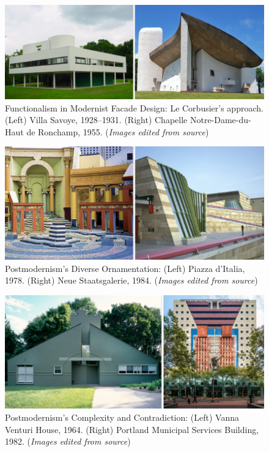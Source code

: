     \begin{figure}[htb]
        \centering
        \includegraphics[width= \linewidth]{Images/ModernistFacade}
        \caption{Functionalism in Modernist Facade Design: Le Corbusier's approach. (Left) Villa Savoye, 1928--1931. (Right) Chapelle Notre-Dame-du-Haut de Ronchamp, 1955. (\textit{Images edited from source})}
        \label{fig:Modernistfacade}
    \end{figure}

    \begin{figure}[htb]
        \centering
        \includegraphics[width= \linewidth]{Images/PostmodernOrnament}
        \caption{Postmodernism's Diverse Ornamentation: (Left) Piazza d’Italia, 1978. (Right) Neue Staatsgalerie, 1984. (\textit{Images edited from source})}
        \label{fig:postmodernOrnamnet}
    \end{figure}

\begin{figure}[htb]
\centering
\includegraphics[width= \linewidth]{Images/PostmodernismVenturi}
\caption{Postmodernism's Complexity and Contradiction: (Left) Vanna Venturi House, 1964. (Right) Portland Municipal Services Building, 1982. (\textit{Images edited from source})}
\label{fig:postmodernfacade}
\end{figure}

